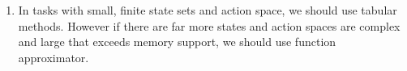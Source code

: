 \documentclass[12pt]{article}
\begin{document}
\begin{enumerate}
\item  In tasks with small, finite state sets and action space, we should use tabular methods.
However if there are far more states and action spaces are complex and large that exceeds memory support, we should use function approximator.
\end{enumerate}
\end{document}
